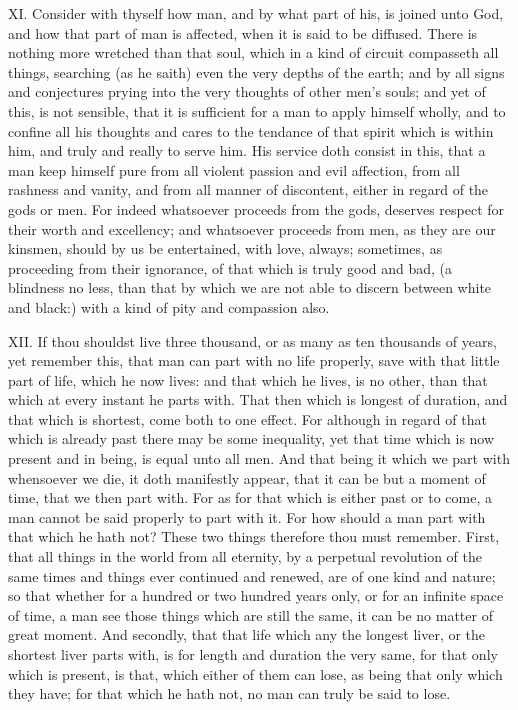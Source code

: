 XI. Consider with thyself how man, and by what part of his, is joined
unto God, and how that part of man is affected, when it is said to be
diffused. There is nothing more wretched than that soul, which in a kind
of circuit compasseth all things, searching (as he saith) even the very
depths of the earth; and by all signs and conjectures prying into the very
thoughts of other men's souls; and yet of this, is not sensible, that it
is sufficient for a man to apply himself wholly, and to confine all his
thoughts and cares to the tendance of that spirit which is within him, and
truly and really to serve him. His service doth consist in this, that a
man keep himself pure from all violent passion and evil affection, from
all rashness and vanity, and from all manner of discontent, either in
regard of the gods or men. For indeed whatsoever proceeds from the gods,
deserves respect for their worth and excellency; and whatsoever proceeds
from men, as they are our kinsmen, should by us be entertained, with love,
always; sometimes, as proceeding from their ignorance, of that which is
truly good and bad, (a blindness no less, than that by which we are not
able to discern between white and black:) with a kind of pity and
compassion also.

XII. If thou shouldst live three thousand, or as many as ten thousands
of years, yet remember this, that man can part with no life properly, save
with that little part of life, which he now lives: and that which he
lives, is no other, than that which at every instant he parts with. That
then which is longest of duration, and that which is shortest, come both
to one effect. For although in regard of that which is already past there
may be some inequality, yet that time which is now present and in being,
is equal unto all men. And that being it which we part with whensoever we
die, it doth manifestly appear, that it can be but a moment of time, that
we then part with. For as for that which is either past or to come, a man
cannot be said properly to part with it. For how should a man part with
that which he hath not? These two things therefore thou must remember.
First, that all things in the world from all eternity, by a perpetual
revolution of the same times and things ever continued and renewed, are of
one kind and nature; so that whether for a hundred or two hundred years
only, or for an infinite space of time, a man see those things which are
still the same, it can be no matter of great moment. And secondly, that
that life which any the longest liver, or the shortest liver parts with,
is for length and duration the very same, for that only which is present,
is that, which either of them can lose, as being that only which they
have; for that which he hath not, no man can truly be said to lose.

